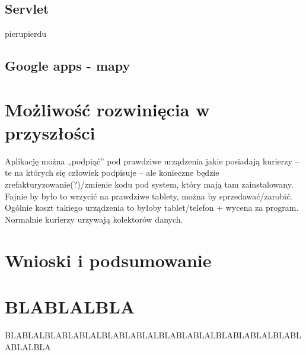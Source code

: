 \documentclass[eng,printmode,oneside]{mgr}
\begin{document}
\section{Servlet}
pierupierdu
\section{Google apps - mapy}

\chapter{Możliwość rozwinięcia w przyszłości}
Aplikację można „podpiąć” pod prawdziwe urządzenia jakie posiadają kurierzy – te na których się człowiek podpisuje – ale konieczne będzie 
zrefakturyzowanie(?)/zmienie kodu pod system, który mają tam zainstalowany.
	Fajnie by było to wrzycić na prawdziwe tablety, można by sprzedawać/zarobić. Ogólnie koszt takiego urządzenia to byłoby tablet/telefon 
	+ wycena za program.
	Normalnie kurierzy urzywają kolektorów danych.

\chapter{Wnioski i podsumowanie}
\appendix
\chapter{BLABLALBLA}
BLABLALBLABLABLALBLABLABLALBLABLABLALBLABLABLALBLABLABLALBLA

\listoffigures
\listoftables
\end{document}
